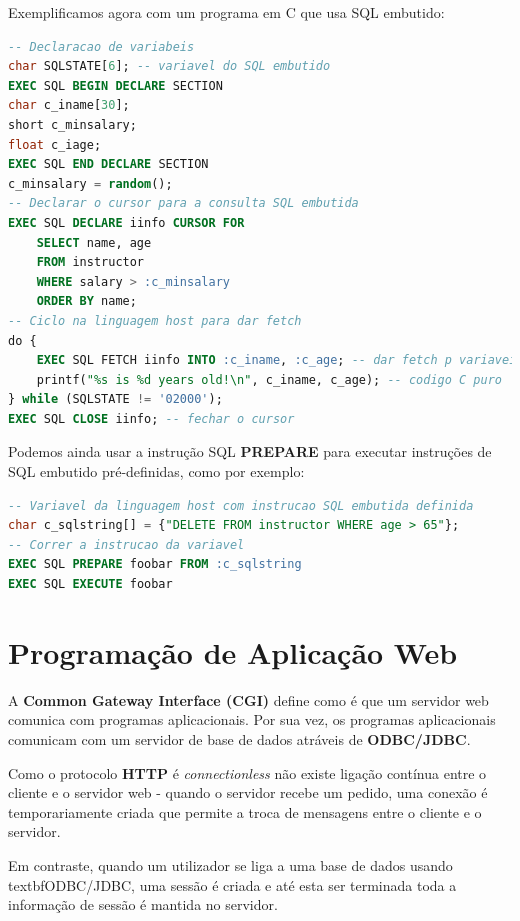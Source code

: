 \documentclass[oneside]{book}
\theoremstyle{definition}
\begin{document}
Exemplificamos agora com um programa em C que usa SQL embutido:
\begin{lstlisting}[language=SQL, morekeywords={char*, EXEC, SQL, CONNECT, IDENTIFIED, DECLARE, SECTION, CURSOR, FOR, short, FETCH, CLOSE}, framesep=8pt, xleftmargin=40pt, framexleftmargin=40pt, frame=tb, framerule=0pt]
-- Declaracao de variabeis
char SQLSTATE[6]; -- variavel do SQL embutido
EXEC SQL BEGIN DECLARE SECTION
char c_iname[30];
short c_minsalary;
float c_iage;
EXEC SQL END DECLARE SECTION
c_minsalary = random();
-- Declarar o cursor para a consulta SQL embutida
EXEC SQL DECLARE iinfo CURSOR FOR
    SELECT name, age
    FROM instructor
    WHERE salary > :c_minsalary
    ORDER BY name;
-- Ciclo na linguagem host para dar fetch
do {
    EXEC SQL FETCH iinfo INTO :c_iname, :c_age; -- dar fetch p variaveis locais
    printf("%s is %d years old!\n", c_iname, c_age); -- codigo C puro
} while (SQLSTATE != '02000');
EXEC SQL CLOSE iinfo; -- fechar o cursor
\end{lstlisting}

Podemos ainda usar a instrução SQL \textbf{PREPARE} para executar instruções de SQL embutido pré-definidas, como por exemplo:
\begin{lstlisting}[language=SQL, morekeywords={char*, EXEC, SQL, CONNECT, IDENTIFIED, DECLARE, SECTION, CURSOR, FOR, short, FETCH, CLOSE}, framesep=8pt, xleftmargin=40pt, framexleftmargin=40pt, frame=tb, framerule=0pt]
-- Variavel da linguagem host com instrucao SQL embutida definida
char c_sqlstring[] = {"DELETE FROM instructor WHERE age > 65"};
-- Correr a instrucao da variavel
EXEC SQL PREPARE foobar FROM :c_sqlstring
EXEC SQL EXECUTE foobar
\end{lstlisting}

\section{Programação de Aplicação Web}
A \textbf{Common Gateway Interface (CGI)} define como é que um servidor web comunica com programas aplicacionais. Por sua vez, os programas aplicacionais comunicam com um servidor de base de dados atráveis de \textbf{ODBC/JDBC}.

Como o protocolo \textbf{HTTP} é \textit{connectionless} não existe ligação contínua entre o cliente e o servidor web - quando o servidor recebe um pedido, uma conexão é temporariamente criada que permite a troca de mensagens entre o cliente e o servidor.

Em contraste, quando um utilizador se liga a uma base de dados usando textbf{ODBC/JDBC}, uma sessão é criada e até esta ser terminada toda a informação de sessão é mantida no servidor.
\end{document}
